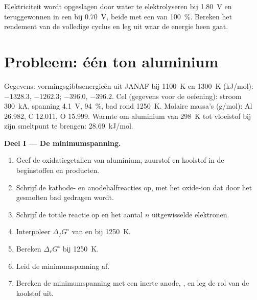 \begin{exercise}[$\star\star\star$]\label{exo:b2:batteries-electrolysis:12}
Elektriciteit wordt opgeslagen door water te elektrolyseren bij \qty{1.80}{V} en teruggewonnen in een
 bij \qty{0.70}{V}, beide met een  van 100~\%. Bereken het
rendement van de volledige cyclus en leg uit waar de energie heen gaat.
\end{exercise}

\section{Probleem: één ton aluminium}

\begin{problem}
\label{pb:b2:batteries-electrolysis:1}
Gegevens: vormingsgibbsenergieën uit JANAF bij \qty{1100}{K} en \qty{1300}{K}
(\unit{kJ/mol}):  $-1328.3$, $-1262.3$;  $-396.0$, $-396.2$. Cel
(gegevens voor de oefening): stroom \qty{300}{kA}, spanning \qty{4.1}{V}, 
94~\%, bad rond \qty{1250}{K}. Molaire massa's (\unit{g/mol}): Al 26.982, C 12.011,
O 15.999. Warmte om aluminium van \qty{298}{K} tot vloeistof bij zijn smeltpunt
te brengen: \qty{28.69}{kJ/mol}.

\medskip
\noindent\textbf{Deel I --- De minimumspanning.}
\begin{enumerate}
  \item Geef de oxidatiegetallen van aluminium, zuurstof en koolstof in de
        beginstoffen en producten.
  \item Schrijf de kathode- en anodehalfreacties op, met het oxide-ion
         dat door het gesmolten bad gedragen wordt.
  \item Schrijf de totale reactie op en het aantal $n$ uitgewisselde elektronen.
  \item Interpoleer $\Delta_f G^\circ$ van  en  bij \qty{1250}{K}.
  \item Bereken $\Delta_r G^\circ$ bij \qty{1250}{K}.
  \item Leid de minimumspanning af.
  \item Bereken de minimumspanning met een inerte anode,
        , en leg de rol van de koolstof uit.
\end{enumerate}


\end{problem}
